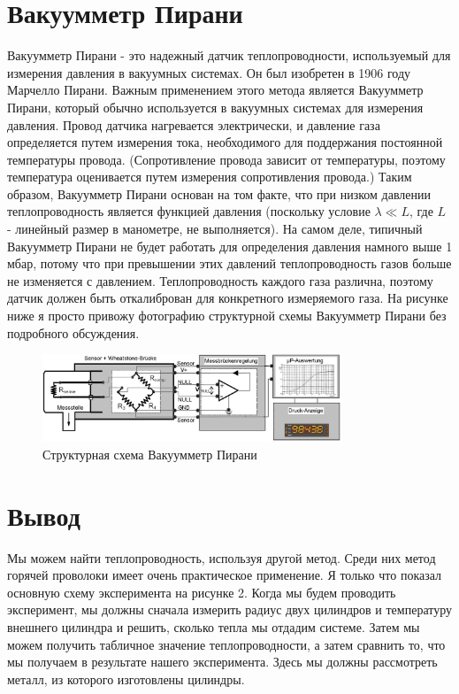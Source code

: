 \documentclass[a4paper, 12pt]{article}%
\begin{document}
\section{Вакуумметр Пирани} Вакуумметр Пирани - это надежный датчик теплопроводности, используемый для измерения давления в вакуумных системах. Он был изобретен в 1906 году Марчелло Пирани. Важным применением этого метода является Вакуумметр Пирани, который обычно используется в вакуумных системах для измерения давления. Провод датчика нагревается электрически, и давление газа определяется путем измерения тока, необходимого для поддержания постоянной температуры провода. (Сопротивление провода зависит от температуры, поэтому температура оценивается путем измерения сопротивления провода.) Таким образом, Вакуумметр Пирани основан на том факте, что при низком давлении теплопроводность является функцией давления (поскольку условие $\lambda \ll L$, где $L$ - линейный размер в манометре, не выполняется). На самом деле, типичный Вакуумметр Пирани не будет работать для определения давления намного выше 1 мбар, потому что при превышении этих давлений теплопроводность газов больше не изменяется с давлением. Теплопроводность каждого газа различна, поэтому датчик должен быть откалиброван для конкретного измеряемого газа. На рисунке ниже я просто привожу фотографию структурной схемы Вакуумметр Пирани без подробного обсуждения.
\begin{figure}[h]
\begin{center}
\includegraphics[width = 0.8\textwidth]{B2.png}
\caption{Структурная схема Вакуумметр Пирани}
\end{center}
\end{figure}
\newpage
\section{Вывод} 
Мы можем найти теплопроводность, используя другой метод. Среди них метод горячей проволоки имеет очень практическое применение. Я только что показал основную схему эксперимента на рисунке 2. Когда мы будем проводить эксперимент, мы должны сначала измерить радиус двух цилиндров и температуру внешнего цилиндра и решить, сколько тепла мы отдадим системе. Затем мы можем получить табличное значение теплопроводности, а затем сравнить то, что мы получаем в результате нашего эксперимента. Здесь мы должны рассмотреть металл, из которого изготовлены цилиндры. 
\end{document}
